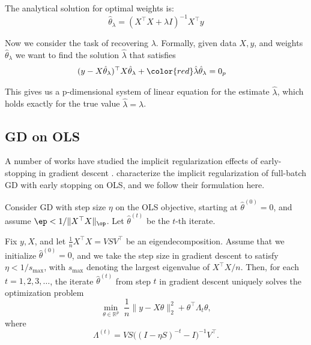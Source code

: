 \documentclass[10pt]{article}
\begin{document}
The analytical solution for optimal weights is: 
$$\hat \theta_\lambda = (X^\top X+\lambda I)^{-1} X^\top y$$

Now we consider the task of recovering $\lambda$. Formally, given data $X, y$, and weights $\hat \theta_\lambda$ we want to find the solution $\hat{\lambda}$ that satisfies
\begin{align*}
    ({y} - X \hat \theta_\lambda)^\top  X \hat \theta_\lambda 
    + {\color{red}\hat{\lambda}} \hat \theta_\lambda &= 0_p
\end{align*}

This gives us a p-dimensional system of linear equation for the estimate $\hat{\lambda}$, which holds exactly for the true value $\hat{\lambda} = \lambda$.

\subsection{GD on OLS}
\label{sec:gd-ols}

A number of works have studied the implicit regularization effects of early-stopping in gradient descent \citep{santos_equivalence_1996, yao_early_2007, ali2019continuous}. \cite{ali2019continuous} characterize the implicit regularization of full-batch GD with early stopping on OLS, and we follow their formulation here.

Consider GD with step size $\eta$ on the OLS objective, starting at $\hat\theta^{(0)} = 0$, and assume $\ep< 1/\|X^\top X\|_{\op}$.
Let $\hat\theta^{(t)}$ be the $t$-th iterate.


\begin{lemma}[Ali et al. 2019]
Fix $y, X$, and let $\tfrac{1}{n}X^\top X = VSV^\top$ be an eigendecomposition. 
Assume that we initialize $\hat{\theta}^{(0)} = 0$, and we take the step size in gradient descent to satisfy 
$\eta < 1/s_{\max}$, with $s_{\max}$ denoting the largest eigenvalue of $X^\top X / n$. 
Then, for each $t = 1,2,3,\dots$, the iterate $\hat{\theta}^{(t)}$ from step $t$ in gradient descent uniquely solves the optimization problem
\[
  \min_{\theta \in \mathbb{R}^p} \; \frac{1}{n}\|y - X\theta\|_2^2 + \theta^\top \Lambda_t \theta,
\]
where
\[
  \Lambda^{(t)} = V S\big((I - \eta S)^{-t} - I\big)^{-1} V^\top.
\]
\end{lemma}

\end{document}
